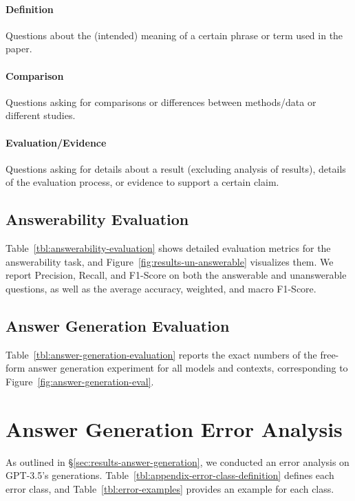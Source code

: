 \begin{multicols}{2}
\paragraph{Definition} Questions about the (intended) meaning of a certain phrase or term used in the paper.
\paragraph{Comparison} Questions asking for comparisons or differences between methods/data or different studies.
\paragraph{Evaluation/Evidence} Questions asking for details about a result (excluding analysis of results), details of the evaluation process, or evidence to support a certain claim.
\end{multicols}



\clearpage

\begin{multicols}{2}
\section{Answerability Evaluation}\label{sec:answerability-evaluation}
Table~\ref{tbl:answerability-evaluation} shows detailed evaluation metrics for the answerability task, and Figure~\ref{fig:results-un-answerable} visualizes them. We report Precision, Recall, and F1-Score on both the answerable and unanswerable questions, as well as the average accuracy, weighted, and macro F1-Score.
\vfill\null
\columnbreak
\vfill\null
\end{multicols}

\clearpage


\begin{multicols}{2}
\section{Answer Generation Evaluation}\label{sec:answer-generation-evaluation}
Table~\ref{tbl:answer-generation-evaluation} reports the exact numbers of the free-form answer generation experiment for all models and contexts, corresponding to Figure~\ref{fig:answer-generation-eval}.
\vfill\null
\columnbreak
\vfill\null
\end{multicols}

\clearpage

\section{Answer Generation Error Analysis}\label{sec:appendix-error-analysis}
As outlined in \S\ref{sec:results-answer-generation}, we conducted an error analysis on GPT-3.5's generations. Table~\ref{tbl:appendix-error-class-definition} defines each error class, and Table~\ref{tbl:error-examples} provides an example for each class.
